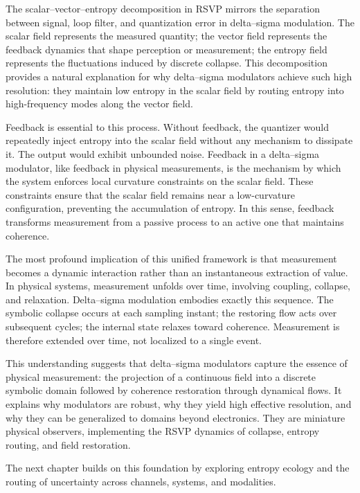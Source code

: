 The scalar–vector–entropy decomposition in RSVP mirrors the separation between signal, loop filter, and quantization error in delta–sigma modulation. The scalar field represents the measured quantity; the vector field represents the feedback dynamics that shape perception or measurement; the entropy field represents the fluctuations induced by discrete collapse. This decomposition provides a natural explanation for why delta–sigma modulators achieve such high resolution: they maintain low entropy in the scalar field by routing entropy into high-frequency modes along the vector field.

Feedback is essential to this process. Without feedback, the quantizer would repeatedly inject entropy into the scalar field without any mechanism to dissipate it. The output would exhibit unbounded noise. Feedback in a delta–sigma modulator, like feedback in physical measurements, is the mechanism by which the system enforces local curvature constraints on the scalar field. These constraints ensure that the scalar field remains near a low-curvature configuration, preventing the accumulation of entropy. In this sense, feedback transforms measurement from a passive process to an active one that maintains coherence.

The most profound implication of this unified framework is that measurement becomes a dynamic interaction rather than an instantaneous extraction of value. In physical systems, measurement unfolds over time, involving coupling, collapse, and relaxation. Delta–sigma modulation embodies exactly this sequence. The symbolic collapse occurs at each sampling instant; the restoring flow acts over subsequent cycles; the internal state relaxes toward coherence. Measurement is therefore extended over time, not localized to a single event.

This understanding suggests that delta–sigma modulators capture the essence of physical measurement: the projection of a continuous field into a discrete symbolic domain followed by coherence restoration through dynamical flows. It explains why modulators are robust, why they yield high effective resolution, and why they can be generalized to domains beyond electronics. They are miniature physical observers, implementing the RSVP dynamics of collapse, entropy routing, and field restoration.

The next chapter builds on this foundation by exploring entropy ecology and the routing of uncertainty across channels, systems, and modalities.


